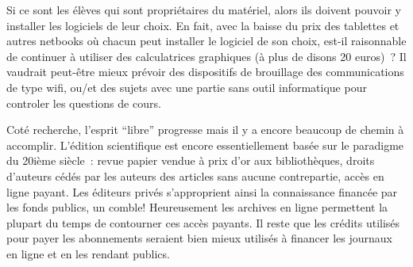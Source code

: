 \documentclass[a4paper,11pt]{article}
\begin{document}
Si ce sont les \'el\`eves qui sont propri\'etaires du mat\'eriel, alors
ils doivent pouvoir y installer les logiciels de leur choix.
En fait, avec la baisse du prix des tablettes et autres
netbooks o\`u chacun peut installer le logiciel de son
choix, est-il raisonnable de continuer \`a utiliser
des calculatrices graphiques (\`a plus de disons 20 euros)~? Il vaudrait
peut-\^etre mieux pr\'evoir des dispositifs de brouillage
des communications de type wifi, ou/et des sujets avec
une partie sans outil informatique pour controler les questions
de cours.

Cot\'e recherche, l'esprit ``libre'' progresse mais il y a encore
beaucoup de chemin \`a accomplir. L'\'edition scientifique
est encore essentiellement bas\'ee sur le paradigme du 20i\`eme
si\`ecle~: revue papier vendue \`a prix d'or aux biblioth\`eques,
droits d'auteurs c\'ed\'es par les auteurs des articles sans aucune
contrepartie, acc\`es en ligne payant. Les \'editeurs priv\'es
s'approprient ainsi la connaissance financ\'ee par les fonds publics,
un comble!
Heureusement les archives en ligne permettent la plupart
du temps de contourner ces acc\`es payants. Il reste
que les cr\'edits utilis\'es pour payer les abonnements seraient
bien mieux utilis\'es \`a financer les journaux en ligne et en
les rendant publics.
\end{document}
